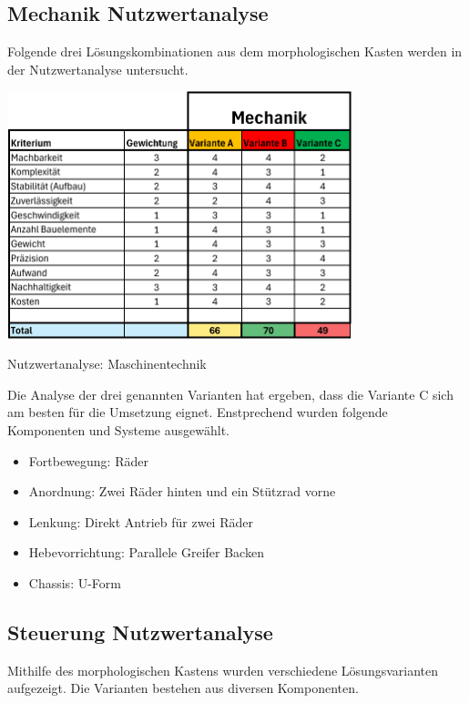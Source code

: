 \subsection{Mechanik Nutzwertanalyse}

Folgende drei Lösungskombinationen aus dem morphologischen Kasten werden in der Nutzwertanalyse untersucht. 



\begin{table}[H]
\centering
\includegraphics[width=0.75\textwidth]{assets/Nutzwertanalyse-M.pdf}
\caption{Nutzwertanalyse: Maschinentechnik}
\label{table:nutzwert-maschinentechnik}
\end{table}

Die Analyse der drei genannten Varianten hat ergeben, dass die Variante C sich am besten für die Umsetzung eignet. Enstprechend wurden folgende Komponenten und Systeme ausgewählt. 

\begin{itemize}
    \item Fortbewegung: Räder 
    \item Anordnung:  Zwei Räder hinten und ein Stützrad vorne
    \item Lenkung: Direkt Antrieb für zwei Räder
    \item Hebevorrichtung: Parallele Greifer Backen
    \item Chassis: U-Form 
\end{itemize}

\subsection{Steuerung Nutzwertanalyse}

Mithilfe des morphologischen Kastens wurden verschiedene Lösungsvarianten aufgezeigt. Die Varianten bestehen aus diversen Komponenten. 


